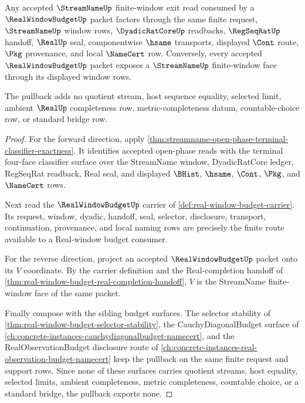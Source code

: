 \begin{theorem}
\label{thm:streamname-real-window-budget-pullback}
Any accepted $\StreamNameUp$ finite-window exit read consumed by a $\RealWindowBudgetUp$ packet factors through the same finite request, $\StreamNameUp$ window rows, $\DyadicRatCoreUp$ readbacks, $\RegSeqRatUp$ handoff, $\RealUp$ seal, componentwise $\hsame$ transports, displayed $\Cont$ route, $\Pkg$ provenance, and local $\NameCert$ row. Conversely, every accepted $\RealWindowBudgetUp$ packet exposes a $\StreamNameUp$ finite-window face through its displayed window rows.

The pullback adds no quotient stream, host sequence equality, selected limit, ambient $\RealUp$ completeness row, metric-completeness datum, countable-choice row, or standard bridge row.
\end{theorem}
\begin{proof}
For the forward direction, apply \autoref{thm:streamname-open-phase-terminal-classifier-exactness}. It identifies accepted open-phase reads with the terminal four-face classifier surface over the StreamName window, DyadicRatCore ledger, RegSeqRat readback, Real seal, and displayed $\BHist$, $\hsame$, $\Cont$, $\Pkg$, and $\NameCert$ rows.

Next read the $\RealWindowBudgetUp$ carrier of \autoref{def:real-window-budget-carrier}. Its request, window, dyadic, handoff, seal, selector, disclosure, transport, continuation, provenance, and local naming rows are precisely the finite route available to a Real-window budget consumer.

For the reverse direction, project an accepted $\RealWindowBudgetUp$ packet onto its $V$ coordinate. By the carrier definition and the Real-completion handoff of \autoref{thm:real-window-budget-real-completion-handoff}, $V$ is the StreamName finite-window face of the same packet.

Finally compose with the sibling budget surfaces. The selector stability of \autoref{thm:real-window-budget-selector-stability}, the CauchyDiagonalBudget surface of \autoref{ch:concrete-instances-cauchydiagonalbudget-namecert}, and the RealObservationBudget disclosure route of \autoref{ch:concrete-instances-real-observation-budget-namecert} keep the pullback on the same finite request and support rows. Since none of these surfaces carries quotient streams, host equality, selected limits, ambient completeness, metric completeness, countable choice, or a standard bridge, the pullback exports none.
\end{proof}

